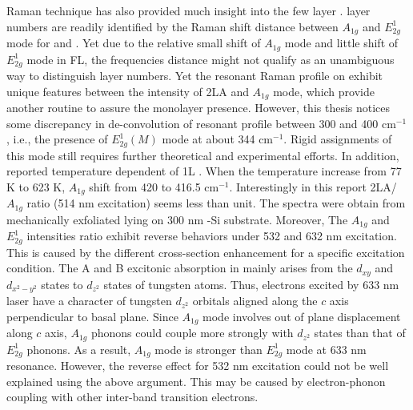 Raman technique has also provided much insight into the few layer .  layer numbers are readily identified by the Raman shift distance between $A_{1g}$ and $E_{2g}^1$ mode for \cite{Buscema2013} and \cite{Berkdemir2013}. Yet due to the relative small shift of $A_{1g}$ mode and little shift of $E_{2g}^1$ mode in  FL, the frequencies distance might not qualify as an unambiguous way to distinguish layer numbers. Yet the resonant Raman profile on  exhibit unique features between the intensity of 2LA and $A_{1g}$ mode,\cite{Berkdemir2013,Zhao2013} which provide another routine to assure the monolayer presence. However, this thesis notices some discrepancy in de-convolution of  resonant profile between 300 and 400 cm$^{-1}$, i.e., the presence of $E_{2g}^1(M)$ mode at about 344 cm$^{-1}$.\cite{Peimyoo2013,Cong2013,Berkdemir2013} Rigid assignments of this mode still requires further theoretical\cite{Ataca2012} and experimental efforts. In addition, \citeauthor{M2013} reported temperature dependent of 1L .\cite{M2013} When the temperature increase from 77 K to 623 K, $A_{1g}$ shift from 420 to 416.5 cm$^{-1}$. Interestingly in this report 2LA/$A_{1g}$ ratio (514 nm excitation) seems less than unit. The spectra were obtain from mechanically exfoliated  lying on 300 nm -Si substrate. Moreover, The $A_{1g}$ and $E_{2g}^1$ intensities ratio exhibit reverse behaviors under 532 and 632 nm excitation. This is caused by the different cross-section enhancement for a specific excitation condition. The A and B excitonic absorption in  mainly arises from the $d_{xy}$ and $d_{x^2 - y^2}$ states to $d_{z^2}$ states of tungsten atoms. Thus, electrons excited by 633 nm laser have a character of tungsten $d_{z^2}$ orbitals aligned along the $c$ axis perpendicular to  basal plane. Since $A_{1g}$ mode involves out of plane displacement along $c$ axis, $A_{1g}$ phonons could couple more strongly with $d_{z^2}$ states than that of $E_{2g}^1$ phonons. As a result, $A_{1g}$ mode is stronger than $E_{2g}^1$ mode at 633 nm resonance.\cite{Zhao2013} However, the reverse effect for 532 nm excitation could not be well explained using the above argument. This may be caused by electron-phonon coupling with other inter-band transition electrons.


